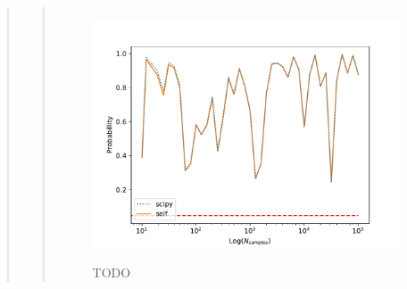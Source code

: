 \begin{quote}
\begin{quote}
\begin{figure}[!hb]
\centering
\includegraphics[width=12cm, height=7.5cm]{./Plots/1_plot_ks_test_self_scipy.pdf}
\caption{TODO}
\end{figure}

\end{quote}



\end{quote}

%

%


%
\newpage











